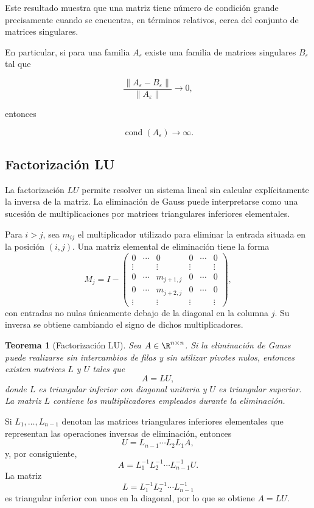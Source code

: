 \documentclass[12pt]{article}
\DeclareMathOperator{\cond}{cond}
\newtheorem{teorema}{Teorema}
\begin{document}
Este resultado muestra que una matriz tiene número de condición grande
precisamente cuando se encuentra, en términos relativos, cerca del
conjunto de matrices singulares.

En particular, si para una familia $A_\varepsilon$ existe una familia
de matrices singulares $B_\varepsilon$ tal que

\[
    \frac{\|A_\varepsilon-B_\varepsilon\|}
         {\|A_\varepsilon\|}
    \longrightarrow0,
\]

entonces

\[
    \boxed{
    \cond(A_\varepsilon)\longrightarrow\infty.
    }
\]
\subsection*{Factorización LU}

La factorización $LU$ permite resolver un sistema lineal sin calcular explícitamente la inversa de la matriz. La eliminación de Gauss puede interpretarse como una sucesión de multiplicaciones por matrices triangulares inferiores elementales.

Para $i>j$, sea $m_{ij}$ el multiplicador utilizado para eliminar la entrada situada en la posición $(i,j)$. Una matriz elemental de eliminación tiene la forma
\[
    M_j
    =I-
    \begin{pmatrix}
    0&\cdots&0&0&\cdots&0\\
    \vdots&&\vdots&\vdots&&\vdots\\
    0&\cdots&m_{j+1,j}&0&\cdots&0\\
    0&\cdots&m_{j+2,j}&0&\cdots&0\\
    \vdots&&\vdots&\vdots&&\vdots
    \end{pmatrix},
\]
con entradas no nulas únicamente debajo de la diagonal en la columna $j$. Su inversa se obtiene cambiando el signo de dichos multiplicadores.

\begin{teorema}[Factorización LU]
Sea $A\in\R^{n\times n}$. Si la eliminación de Gauss puede realizarse sin intercambios de filas y sin utilizar pivotes nulos, entonces existen matrices $L$ y $U$ tales que
\[
    A=LU,
\]
donde $L$ es triangular inferior con diagonal unitaria y $U$ es triangular superior. La matriz $L$ contiene los multiplicadores empleados durante la eliminación.
\end{teorema}

Si $L_1,\ldots,L_{n-1}$ denotan las matrices triangulares inferiores elementales que representan las operaciones inversas de eliminación, entonces
\[
    U=L_{n-1}\cdots L_2L_1A,
\]
y, por consiguiente,
\[
    A=L_1^{-1}L_2^{-1}\cdots L_{n-1}^{-1}U.
\]
La matriz
\[
    L=L_1^{-1}L_2^{-1}\cdots L_{n-1}^{-1}
\]
es triangular inferior con unos en la diagonal, por lo que se obtiene $A=LU$.
\end{document}

